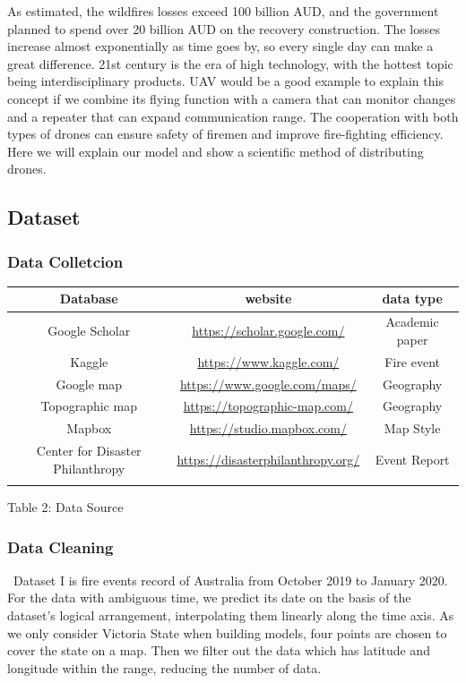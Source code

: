 \documentclass{mcmthesis}
\begin{document}
As estimated, the wildfires losses exceed 100 billion AUD, and the government planned to spend over 20 billion AUD on the recovery construction. The losses increase almost exponentially as time goes by, so every single day can make a great difference. 21st century is the era of high technology, with the hottest topic being interdisciplinary products. UAV would be a good example to explain this concept if we combine its flying function with a camera that can monitor changes and a repeater that can expand communication range. The cooperation with both types of drones can ensure safety of firemen and improve fire-fighting efficiency. Here we will explain our model and show a scientific method of distributing	 drones. 

\subsection{Dataset}
\subsubsection{Data Colletcion}

\begin{center}
	\begin{tabular}{ccc}
		\hline
		Database & website & data type\\
		\hline
		Google Scholar & \url{https://scholar.google.com/} & Academic paper\\
		Kaggle & \url{https://www.kaggle.com/} &  Fire event\\
		Google map & \url{https://www.google.com/maps/} & Geography\\
		Topographic map & \url{https://topographic-map.com/} & Geography\\
		Mapbox & \url{https://studio.mapbox.com/} & Map Style\\
		Center for Disaster Philanthropy & \url{https://disasterphilanthropy.org/} & Event Report \\
		\hline
		\label{table:data}
	\end{tabular}
\end{center}
\begin{center}
	Table 2: Data Source
\end{center}
\subsubsection{Data Cleaning}
\quad \, Dataset I is fire events record of Australia from October 2019 to January 2020. For the data with ambiguous time, we predict its date on the basis of the dataset’s logical arrangement, interpolating them linearly along the time axis. As we only consider Victoria State when building models, four points are chosen to cover the state on a map. Then we filter out the data which has latitude and longitude within the range, reducing the number of data.  
\end{document}
